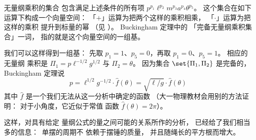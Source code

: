 无量纲乘积的集合
包含满足上述条件的所有项 $p^{p_1}\ell^{p_2}m^{p_3}a^{p_4}\theta^{p_5}$。
这个集合在如下运算下构成一个向量空间：
「$+$」运算为把两个这样的乘积相乘，
「$\cdot$」运算为把这样的乘积
提升到标量的幂
（见 ）。
Buckingham 定理中的
「完备无量纲乘积集合」一词，
指的就是这个向量空间的一组基。

我们可以这样得到一组基：
先取 $p_1=1$、$p_5=0$，再取 $p_1=0$、$p_5=1$。
相应的无量纲
乘积是 $\Pi_1=p\ell^{-1/2}g^{1/2}$ 与 $\Pi_2=\theta$。
因为集合 $\set{\Pi_1,\Pi_2}$ 是完备的，
Buckingham 定理说
\begin{equation*}
  p = \ell^{1/2}g^{-1/2}\cdot\hat{f}(\theta) 
    = \sqrt{\ell/g}\cdot\hat{f}(\theta)
\end{equation*}
其中 $\hat{f}$ 是一个我们无法从这一分析中确定的函数
（大一物理教材会用别的方法证明：
对于小角度，它近似于常值
函数 $\hat{f}(\theta)=2\pi$）。

这样，对具有给定
量纲公式的量之间可能的关系所作的分析，
已经给了我们相当多的信息：~单摆的周期不 
依赖于摆锤的质量，
并且随绳长的平方根而增大。

